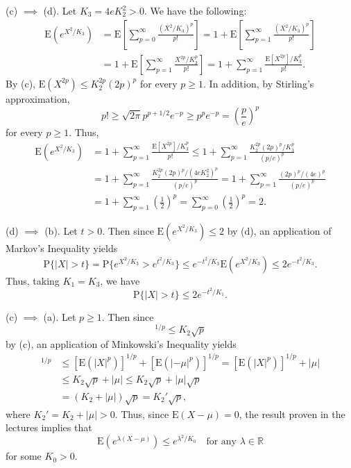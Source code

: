 \documentclass[12pt]{article}
\newcommand{\E}{\mathrm{E}}
\newcommand{\Prob}{\mathrm{P}}
\begin{document}
\begin{enumerate}
(c) $\implies$ (d). Let $K_3 = 4eK_2^2 > 0$. We have the following:
\begin{align*}
\E(e^{X^2/K_3}) &= \E\left[\sum_{p=0}^\infty \frac{(X^2/K_3)^p}{p!}\right] = 1 + \E\left[\sum_{p=1}^\infty \frac{(X^2/K_3)^p}{p!}\right] \\
&= 1 + \E\left[\sum_{p=1}^\infty \frac{X^{2p}/K_3^p}{p!}\right] = 1 + \sum_{p=1}^\infty \frac{\E[X^{2p}]/K_3^p}{p!}.
\end{align*}
By (c), $\E(X^{2p}) \leq K_2^{2p} (2p)^p$ for every $p \geq 1$. In addition, by Stirling's approximation,
\begin{equation*}
p! \geq \sqrt{2\pi} p^{p+1/2} e^{-p} \geq p^p e^{-p} = \left(\frac{p}{e}\right)^p
\end{equation*}
for every $p \geq 1$. Thus,
\begin{align*}
\E(e^{X^2/K_3}) &= 1 + \sum_{p=1}^\infty \frac{\E[X^{2p}]/K_3^p}{p!} \leq 1 + \sum_{p=1}^\infty \frac{K_2^{2p} (2p)^p/K_3^p}{(p/e)^p} \\
&= 1 + \sum_{p=1}^\infty \frac{K_2^{2p} (2p)^p/(4eK_2^2)^p}{(p/e)^p} = 1 + \sum_{p=1}^\infty \frac{(2p)^p/(4e)^p}{(p/e)^p} \\
&= 1 + \sum_{p=1}^\infty \left(\frac{1}{2}\right)^p = \sum_{p=0}^\infty \left(\frac{1}{2}\right)^p = 2.
\end{align*}

(d) $\implies$ (b). Let $t > 0$. Then since $\E(e^{X^2/K_3}) \leq 2$ by (d), an application of Markov's Inequality yields
\begin{equation*}
\Prob\{|X| > t\} = \Prob\{e^{X^2/K_3} > e^{t^2/K_3}\} \leq e^{-t^2/K_3} \E(e^{X^2/K_3}) \leq 2e^{-t^2/K_3}.
\end{equation*}
Thus, taking $K_1 = K_3$, we have
\begin{equation*}
\Prob\{|X| > t\} \leq 2e^{-t^2/K_1}.
\end{equation*}

(c) $\implies$ (a). Let $p \geq 1$. Then since
\begin{equation*}
[\E(|X|^p)]^{1/p} \leq K_2 \sqrt{p}
\end{equation*}
by (c), an application of Minkowski's Inequality yields
\begin{align*}
[\E(|X-\mu|^p)]^{1/p} &\leq [\E(|X|^p)]^{1/p} + [\E(|-\mu|^p)]^{1/p} = [\E(|X|^p)]^{1/p} + |\mu| \\
&\leq K_2 \sqrt{p} + |\mu| \leq K_2 \sqrt{p} + |\mu| \sqrt{p} \\
&= (K_2 + |\mu|) \sqrt{p} = K_2' \sqrt{p},
\end{align*}
where $K_2' = K_2 + |\mu| > 0$. Thus, since $\E(X-\mu) = 0$, the result proven in the lectures implies that
\begin{equation*}
\E(e^{\lambda (X-\mu)}) \leq e^{\lambda^2/K_0} \quad \text{for any $\lambda \in \mathbb{R}$}
\end{equation*}
for some $K_0 > 0$.


\end{enumerate}
\end{document}

